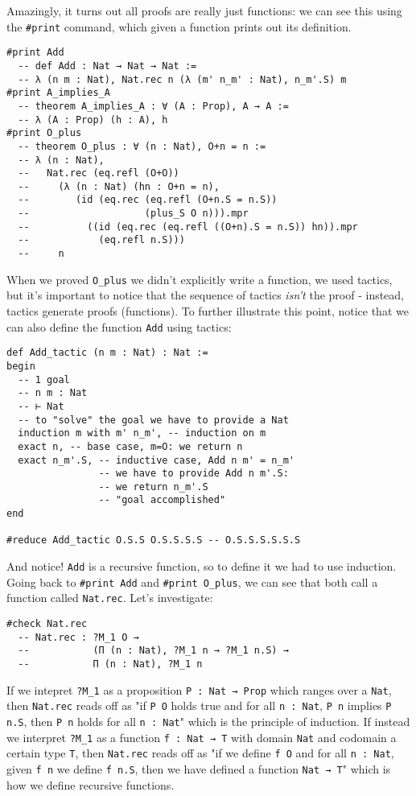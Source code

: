 \documentclass{book}
\theoremstyle{definition}
\theoremstyle{remark}
\theoremstyle{plain}
\begin{document}
Amazingly, it turns out all proofs are really just functions: we can see this using the \lstinline{#print} command,
which given a function prints out its definition.
\begin{lstlisting}
#print Add
  -- def Add : Nat → Nat → Nat :=
  -- λ (n m : Nat), Nat.rec n (λ (m' n_m' : Nat), n_m'.S) m
#print A_implies_A
  -- theorem A_implies_A : ∀ (A : Prop), A → A :=
  -- λ (A : Prop) (h : A), h
#print O_plus
  -- theorem O_plus : ∀ (n : Nat), O+n = n :=
  -- λ (n : Nat),
  --   Nat.rec (eq.refl (O+O))
  --     (λ (n : Nat) (hn : O+n = n),
  --        (id (eq.rec (eq.refl (O+n.S = n.S))
  --                    (plus_S O n))).mpr
  --          ((id (eq.rec (eq.refl ((O+n).S = n.S)) hn)).mpr
  --            (eq.refl n.S)))
  --     n
\end{lstlisting}
When we proved \lstinline{O_plus} we didn't explicitly write a function,
we used tactics, but it's important to notice that the sequence of tactics \textit{isn't} the proof -
instead, tactics generate proofs (functions).
To further illustrate this point, notice that we can also define the function \lstinline{Add} using tactics:
\begin{lstlisting}
def Add_tactic (n m : Nat) : Nat :=
begin
  -- 1 goal
  -- n m : Nat
  -- ⊢ Nat
  -- to "solve" the goal we have to provide a Nat
  induction m with m' n_m', -- induction on m
  exact n, -- base case, m=O: we return n
  exact n_m'.S, -- inductive case, Add n m' = n_m'
                -- we have to provide Add n m'.S:
                -- we return n_m'.S
                -- "goal accomplished"
end

#reduce Add_tactic O.S.S O.S.S.S.S -- O.S.S.S.S.S.S
\end{lstlisting}
And notice! \lstinline{Add} is a recursive function, so to define it we had to use induction.
Going back to \lstinline{#print Add} and \lstinline{#print O_plus},
we can see that both call a function called \lstinline{Nat.rec}. Let's investigate:
\begin{lstlisting}
#check Nat.rec
  -- Nat.rec : ?M_1 O →
  --           (Π (n : Nat), ?M_1 n → ?M_1 n.S) →
  --           Π (n : Nat), ?M_1 n
\end{lstlisting}
If we intepret \lstinline{?M_1} as a proposition \lstinline{P : Nat → Prop} which ranges over a \lstinline{Nat},
then \lstinline{Nat.rec} reads off as
"if \lstinline{P O} holds true and for all \lstinline{n : Nat},
\lstinline{P n} implies \lstinline{P n.S}, then \lstinline{P n} holds for all \lstinline{n : Nat}" which is the principle of induction.
If instead we interpret \lstinline{?M_1} as a function \lstinline{f : Nat → T} with domain \lstinline{Nat} and codomain a certain type \lstinline{T},
then \lstinline{Nat.rec} reads off as
"if we define \lstinline{f O} and for all \lstinline{n : Nat},
given \lstinline{f n} we define \lstinline{f n.S}, then we have defined a function \lstinline{Nat → T}" which is how we define recursive functions.
\end{document}

